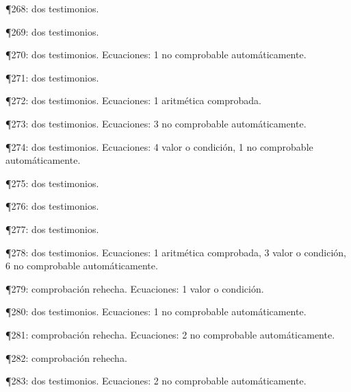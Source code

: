 \documentclass[10pt,openany]{book}
\begin{document}
\noindent ¶268: dos testimonios.\par
\noindent ¶269: dos testimonios.\par
\noindent ¶270: dos testimonios. Ecuaciones: 1 no comprobable automáticamente.\par
\noindent ¶271: dos testimonios.\par
\noindent ¶272: dos testimonios. Ecuaciones: 1 aritmética comprobada.\par
\noindent ¶273: dos testimonios. Ecuaciones: 3 no comprobable automáticamente.\par
\noindent ¶274: dos testimonios. Ecuaciones: 4 valor o condición, 1 no comprobable automáticamente.\par
\noindent ¶275: dos testimonios.\par
\noindent ¶276: dos testimonios.\par
\noindent ¶277: dos testimonios.\par
\noindent ¶278: dos testimonios. Ecuaciones: 1 aritmética comprobada, 3 valor o condición, 6 no comprobable automáticamente.\par
\noindent ¶279: comprobación rehecha. Ecuaciones: 1 valor o condición.\par
\noindent ¶280: dos testimonios. Ecuaciones: 1 no comprobable automáticamente.\par
\noindent ¶281: comprobación rehecha. Ecuaciones: 2 no comprobable automáticamente.\par
\noindent ¶282: comprobación rehecha.\par
\noindent ¶283: dos testimonios. Ecuaciones: 2 no comprobable automáticamente.\par
\end{document}
